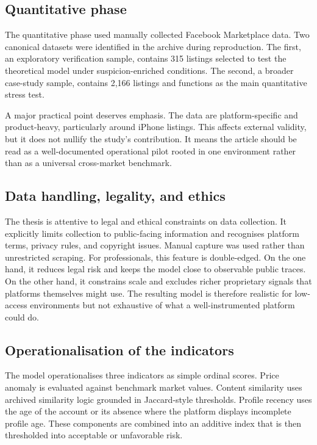 \documentclass[11pt,a4paper]{article}
\begin{document}
\subsection{Quantitative phase}
The quantitative phase used manually collected Facebook Marketplace data. Two canonical datasets were identified in the archive during reproduction. The first, an exploratory verification sample, contains 315 listings selected to test the theoretical model under suspicion-enriched conditions. The second, a broader case-study sample, contains 2,166 listings and functions as the main quantitative stress test.

A major practical point deserves emphasis. The data are platform-specific and product-heavy, particularly around iPhone listings. This affects external validity, but it does not nullify the study's contribution. It means the article should be read as a well-documented operational pilot rooted in one environment rather than as a universal cross-market benchmark.

\subsection{Data handling, legality, and ethics}
The thesis is attentive to legal and ethical constraints on data collection. It explicitly limits collection to public-facing information and recognises platform terms, privacy rules, and copyright issues. Manual capture was used rather than unrestricted scraping. For professionals, this feature is double-edged. On the one hand, it reduces legal risk and keeps the model close to observable public traces. On the other hand, it constrains scale and excludes richer proprietary signals that platforms themselves might use. The resulting model is therefore realistic for low-access environments but not exhaustive of what a well-instrumented platform could do.

\subsection{Operationalisation of the indicators}
The model operationalises three indicators as simple ordinal scores. Price anomaly is evaluated against benchmark market values. Content similarity uses archived similarity logic grounded in Jaccard-style thresholds. Profile recency uses the age of the account or its absence where the platform displays incomplete profile age. These components are combined into an additive index that is then thresholded into acceptable or unfavorable risk.
\end{document}
